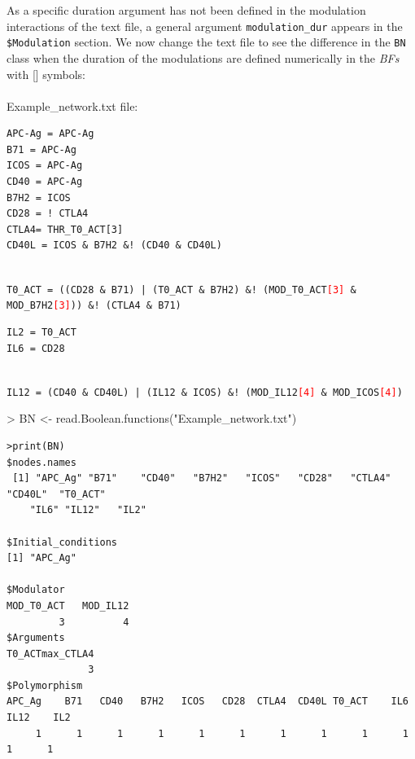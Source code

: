 \documentclass[a4paper]{article}
\begin{document}
As a specific duration argument has not been defined in the modulation interactions of the text file, a general argument \texttt{modulation\_dur} appears in the \texttt{\$Modulation} section.
We now change the text file to see the difference in the \texttt{BN} class when the duration of the modulations are defined numerically in the \emph{BFs} with [] symbols:
\\
\\ Example\_network.txt file:
\begin{framed}
\begin{BVerbatim}
APC-Ag = APC-Ag
B71 = APC-Ag
ICOS = APC-Ag
CD40 = APC-Ag
B7H2 = ICOS
CD28 = ! CTLA4
CTLA4= THR_T0_ACT[3]
CD40L = ICOS & B7H2 &! (CD40 & CD40L)
\end{BVerbatim}
\\
\texttt{T0\_ACT = ((CD28 \& B71) | (T0\_ACT \& B7H2) \&! (MOD\_T0\_ACT\textcolor{red}{[3]} \& MOD\_B7H2\textcolor{red}{[3]})) \&! (CTLA4 \& B71)}\\
\begin{BVerbatim}
IL2 = T0_ACT
IL6 = CD28
\end{BVerbatim}
\\
\texttt{IL12 = (CD40 \& CD40L) | (IL12 \& ICOS) \&! (MOD\_IL12\textcolor{red}{[4]} \& MOD\_ICOS\textcolor{red}{[4]})}

\end{framed}


\begin{Schunk}
\begin{Sinput}
> BN <- read.Boolean.functions("Example_network.txt")
\end{Sinput}
\end{Schunk}
\begin{verbatim}
>print(BN)
$nodes.names
 [1] "APC_Ag" "B71"    "CD40"   "B7H2"   "ICOS"   "CD28"   "CTLA4"  "CD40L"  "T0_ACT" 
    "IL6" "IL12"   "IL2"
    
$Initial_conditions
[1] "APC_Ag"

$Modulator
MOD_T0_ACT   MOD_IL12 
         3          4 
$Arguments
T0_ACTmax_CTLA4 
              3 
$Polymorphism
APC_Ag    B71   CD40   B7H2   ICOS   CD28  CTLA4  CD40L T0_ACT    IL6   IL12    IL2 
     1      1      1      1      1      1      1      1      1      1      1      1 

\end{verbatim}
\end{document}
